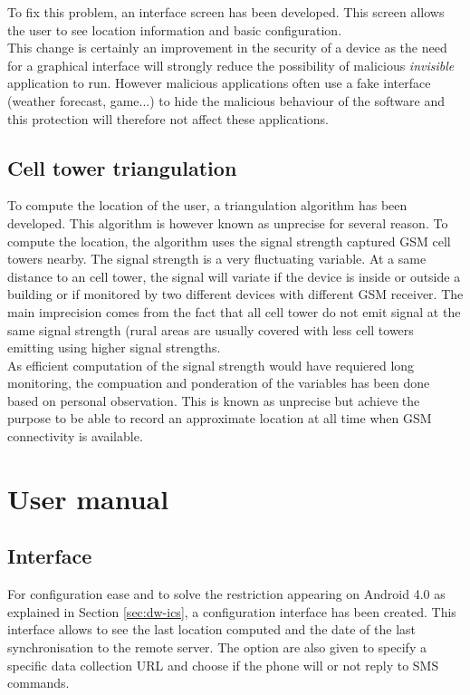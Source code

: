 To fix this problem, an interface screen has been developed.
This screen allows the user to see location information and basic configuration.\\

This change is certainly an improvement in the security of a device as the need for a graphical interface will strongly reduce the possibility of malicious \emph{invisible} application to run.
However malicious applications often use a fake interface (weather forecast, game...) to hide the malicious behaviour of the software and this protection will therefore not affect these applications.

\subsection{Cell tower triangulation}
\label{sec:dw-difficult-cell}

To compute the location of the user, a triangulation algorithm has been developed.
This algorithm is however known as unprecise for several reason.
To compute the location, the algorithm uses the signal strength captured GSM cell towers nearby.
The signal strength is a very fluctuating variable.
At a same distance to an cell tower, the signal will variate if the device is inside or outside a building or if monitored by two different devices with different GSM receiver.
The main imprecision comes from the fact that all cell tower do not emit signal at the same signal strength (rural areas are usually covered with less cell towers emitting using higher signal strengths.\\

As efficient computation of the signal strength would have requiered long monitoring, the compuation and ponderation of the variables has been done based on personal observation.
This is known as unprecise but achieve the purpose to be able to record an approximate location at all time when GSM connectivity is available.\\

\section{User manual}

\subsection{Interface}
\label{sec:dw-gui}

For configuration ease and to solve the restriction appearing on Android 4.0 as explained in Section \ref{sec:dw-ics}, a configuration interface has been created.
This interface allows to see the last location computed and the date of the last synchronisation to the remote server.
The option are also given to specify a specific data collection URL and choose if the phone will or not reply to SMS commands.

